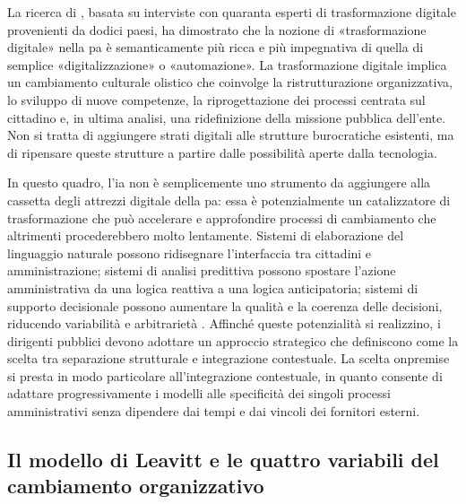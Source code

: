 La ricerca di \textcite{Mergel2019}, basata su interviste con quaranta esperti di trasformazione digitale provenienti da dodici paesi, ha dimostrato che la nozione di «trasformazione digitale» nella \gls{pa} è semanticamente più ricca e più impegnativa di quella di semplice «digitalizzazione» o «automazione». La trasformazione digitale implica un cambiamento culturale olistico che coinvolge la ristrutturazione organizzativa, lo sviluppo di nuove competenze, la riprogettazione dei processi centrata sul cittadino e, in ultima analisi, una ridefinizione della missione pubblica dell'ente. Non si tratta di aggiungere strati digitali alle strutture burocratiche esistenti, ma di ripensare queste strutture a partire dalle possibilità aperte dalla tecnologia.

In questo quadro, l'\gls{ia} non è semplicemente uno strumento da aggiungere alla cassetta degli attrezzi digitale della \gls{pa}: essa è potenzialmente un catalizzatore di trasformazione che può accelerare e approfondire processi di cambiamento che altrimenti procederebbero molto lentamente. Sistemi di elaborazione del linguaggio naturale possono ridisegnare l'interfaccia tra cittadini e amministrazione; sistemi di analisi predittiva possono spostare l'azione amministrativa da una logica reattiva a una logica anticipatoria; sistemi di supporto decisionale possono aumentare la qualità e la coerenza delle decisioni, riducendo variabilità e arbitrarietà \parencite{Wirtz2019}. Affinché queste potenzialità si realizzino, i dirigenti pubblici devono adottare un approccio strategico che \textcite{Selten2024} definiscono come la scelta tra separazione strutturale e integrazione contestuale. La scelta \gls{onpremise} si presta in modo particolare all'integrazione contestuale, in quanto consente di adattare progressivamente i modelli alle specificità dei singoli processi amministrativi senza dipendere dai tempi e dai vincoli dei fornitori esterni.

\subsection{Il modello di Leavitt e le quattro variabili del cambiamento organizzativo}

